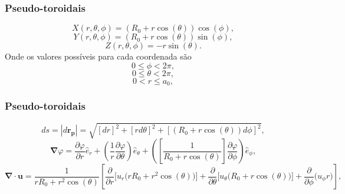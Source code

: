 \documentclass[aspectratio=169]{beamer}
\begin{document}
		   \begin{frame}
			\frametitle{Pseudo-toroidais}
	\begin{equation}
\label{rX}
X(r,\theta,\phi) = (R_0+r \cos(\theta)) \cos(\phi),
\end{equation}
\begin{equation}
\label{rY}
Y(r,\theta,\phi) = (R_0+r \cos(\theta)) \sin(\phi),
\end{equation}
\begin{equation}
\label{rZ}
Z(r,\theta,\phi) = -r \sin(\theta).
\end{equation}
Onde os valores possíveis para cada coordenada são
\begin{equation}
0 \leq \phi < 2 \pi,
\end{equation}
\begin{equation}
0 \leq \theta < 2 \pi,
\end{equation}
\begin{equation}
\label{maxr}
0 < r \leq a_0,
\end{equation}
	\end{frame}
	   \begin{frame}
			\frametitle{Pseudo-toroidais}
\begin{equation}
ds=|d\bm{r_p}| = \sqrt{[dr]^2+  [r d\theta ]^2+[(R_0+r \cos(\theta)) d\phi ]^2},
\end{equation}
\begin{equation}
\bm{\nabla} \varphi = \dfrac{\partial \varphi}{\partial r}  \hat{e}_r + \left(\frac{1}{r}\dfrac{\partial \varphi}{\partial \theta} \right) \hat{e}_\theta + \left( \left[ \frac{1}{ R_0 + r \cos(\theta)}\right] \dfrac{\partial \varphi}{\partial \phi}\right) \hat{e}_\phi,
\end{equation}
\begin{equation}
\bm{\nabla} \cdot \bm{u} = \frac{1}{r R_0 + r^2 \cos(\theta)} \left[ \dfrac{\partial}{\partial r} \Big[u_r \big(r R_0 + r^2 \cos(\theta)\big)\Big] + \dfrac{\partial}{\partial \theta}\Big[ u_\theta \big( R_0 + r \cos(\theta) \big) \Big] +  \dfrac{\partial }{\partial \phi}\big( u_\phi  r \big) \right],
\end{equation}

	\end{frame}
\end{document}
